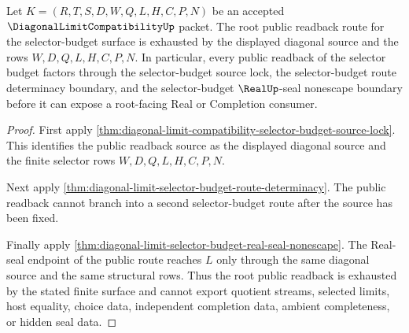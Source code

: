 \begin{theorem}
\label{thm:diagonal-limit-selector-budget-root-public-readback-exhaustion}
Let $K=(R,T,S,D,W,Q,L,H,C,P,N)$ be an accepted $\DiagonalLimitCompatibilityUp$ packet. The root public readback route for the selector-budget surface is exhausted by the displayed diagonal source and the rows $W,D,Q,L,H,C,P,N$. In particular, every public readback of the selector budget factors through the selector-budget source lock, the selector-budget route determinacy boundary, and the selector-budget $\RealUp$-seal nonescape boundary before it can expose a root-facing Real or Completion consumer.
\end{theorem}
\begin{proof}
First apply \autoref{thm:diagonal-limit-compatibility-selector-budget-source-lock}. This identifies the public readback source as the displayed diagonal source and the finite selector rows $W,D,Q,L,H,C,P,N$.

Next apply \autoref{thm:diagonal-limit-selector-budget-route-determinacy}. The public readback cannot branch into a second selector-budget route after the source has been fixed.

Finally apply \autoref{thm:diagonal-limit-selector-budget-real-seal-nonescape}. The Real-seal endpoint of the public route reaches $L$ only through the same diagonal source and the same structural rows. Thus the root public readback is exhausted by the stated finite surface and cannot export quotient streams, selected limits, host equality, choice data, independent completion data, ambient completeness, or hidden seal data.
\end{proof}

